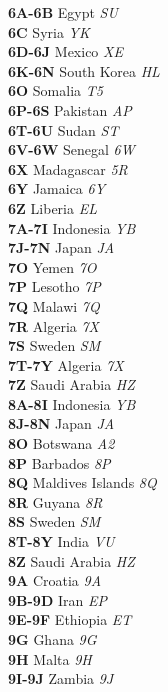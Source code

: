 \documentclass[landscape,a4paper]{article}
\begin{document}
\begin{multicols}{7}
\textbf{6A-6B} Egypt \emph{SU} \\
\textbf{6C} Syria \emph{YK} \\
\textbf{6D-6J} Mexico \emph{XE} \\
\textbf{6K-6N} South Korea \emph{HL} \\
\textbf{6O} Somalia \emph{T5} \\
\textbf{6P-6S} Pakistan \emph{AP} \\
\textbf{6T-6U} Sudan \emph{ST} \\
\textbf{6V-6W} Senegal \emph{6W} \\
\textbf{6X} Madagascar \emph{5R} \\
\textbf{6Y} Jamaica \emph{6Y} \\
\textbf{6Z} Liberia \emph{EL} \\
\textbf{7A-7I} Indonesia \emph{YB} \\
\textbf{7J-7N} Japan \emph{JA} \\
\textbf{7O} Yemen \emph{7O} \\
\textbf{7P} Lesotho \emph{7P} \\
\textbf{7Q} Malawi \emph{7Q} \\
\textbf{7R} Algeria \emph{7X} \\
\textbf{7S} Sweden \emph{SM} \\
\textbf{7T-7Y} Algeria \emph{7X} \\
\textbf{7Z} Saudi Arabia \emph{HZ} \\
\textbf{8A-8I} Indonesia \emph{YB} \\
\textbf{8J-8N} Japan \emph{JA} \\
\textbf{8O} Botswana \emph{A2} \\
\textbf{8P} Barbados \emph{8P} \\
\textbf{8Q} Maldives Islands \emph{8Q} \\
\textbf{8R} Guyana \emph{8R} \\
\textbf{8S} Sweden \emph{SM} \\
\textbf{8T-8Y} India \emph{VU} \\
\textbf{8Z} Saudi Arabia \emph{HZ} \\
\textbf{9A} Croatia \emph{9A} \\
\textbf{9B-9D} Iran \emph{EP} \\
\textbf{9E-9F} Ethiopia \emph{ET} \\
\textbf{9G} Ghana \emph{9G} \\
\textbf{9H} Malta \emph{9H} \\
\textbf{9I-9J} Zambia \emph{9J} \\

\end{multicols}
\end{document}
